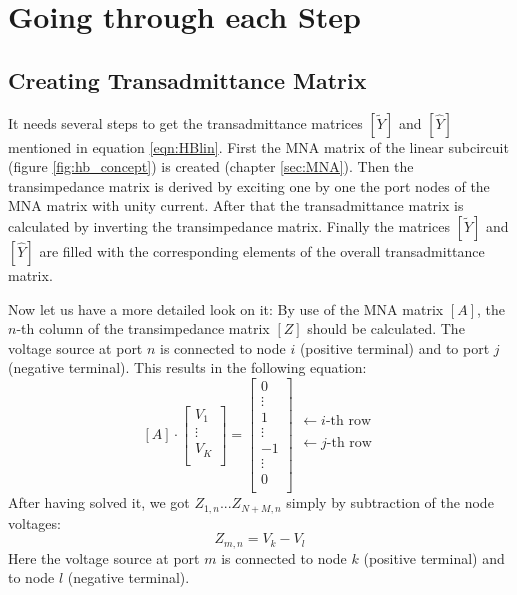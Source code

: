 \section{Going through each Step}

\subsection{Creating Transadmittance Matrix}

It needs several steps to get the transadmittance matrices $[\tilde{Y}]$
and $[\hat{Y}]$ mentioned in equation \eqref{eqn:HBlin}. First the MNA
matrix of the linear subcircuit (figure \ref{fig:hb_concept}) is created
(chapter \ref{sec:MNA}). Then the transimpedance matrix is derived by
exciting one by one the port nodes of the MNA matrix with unity current.
After that the transadmittance matrix is calculated by inverting the
transimpedance matrix. Finally the matrices $[\tilde{Y}]$ and $[\hat{Y}]$
are filled with the corresponding elements of the overall transadmittance
matrix.

\addvspace{12pt}

Now let us have a more detailed look on it: By use of the MNA matrix
$[A]$, the $n$-th column of the transimpedance matrix $[Z]$ should be
calculated. The voltage source at port $n$ is connected to node $i$
(positive terminal) and to port $j$ (negative terminal). This results
in the following equation:
\begin{equation}
\label{eqn:HBtrans}
[A]\cdot
\begin{bmatrix}
V_1\\
\vdots\\
V_K\\
\end{bmatrix}
=
\begin{bmatrix}
0\\
\vdots\\
1\\
\vdots\\
-1\\
\vdots\\
0\\
\end{bmatrix}
\begin{matrix}
 \\
 \\
\leftarrow i\text{-th row}\\
 \\
\leftarrow j\text{-th row}\\
 \\
 \\
\end{matrix}
\end{equation}
After having solved it, we got $Z_{1,n}$...$Z_{N+M,n}$
simply by subtraction of the node voltages:
\begin{equation}
Z_{m,n} = V_k - V_l
\end{equation}
Here the voltage source at port $m$ is connected to node $k$
(positive terminal) and to node $l$ (negative terminal).


